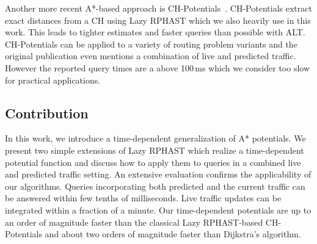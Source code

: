\documentclass[a4paper,UKenglish,cleveref, autoref, thm-restate,anonymous]{lipics-v2021}
\begin{document}
Another more recent A*-based approach is CH-Potentials~\cite{strasser_et_al:LIPIcs.SEA.2021.6}.
CH-Potentials extract exact distances from a CH using Lazy RPHAST which we also heavily use in this work.
This leads to tighter estimates and faster queries than possible with ALT.
CH-Potentials can be applied to a variety of routing problem variants and the original publication even mentions a combination of live and predicted traffic.
However the reported query times are a above 100\,ms which we consider too slow for practical applications.

\subsection{Contribution}

In this work, we introduce a time-dependent generalization of A* potentials.
We present two simple extensions of Lazy RPHAST which realize a time-dependent potential function and discuss how to apply them to queries in a combined live and predicted traffic setting.
An extensive evaluation confirms the applicability of our algorithms.
Queries incorporating both predicted and the current traffic can be answered within few tenths of milliseconds.
Live traffic updates can be integrated within a fraction of a minute.
Our time-dependent potentials are up to an order of magnitude faster than the classical Lazy RPHAST-based CH-Potentials and about two orders of magnitude faster than Dijkstra's algorithm.
\end{document}
